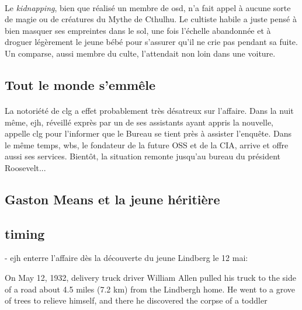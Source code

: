 \paragraph{} Le \emph{kidnapping}, bien que réalisé un membre de \gls{osd}, n'a fait appel à aucune sorte de magie ou de créatures
du Mythe de Cthulhu. Le cultiste habile a juste pensé à bien masquer ses empreintes dans le sol, une fois l'échelle abandonnée et 
à droguer légèrement le jeune bébé pour s'assurer qu'il ne crie pas pendant sa fuite. Un comparse, aussi membre du culte, l'attendait
non loin dans une voiture.
\subsection{Tout le monde s'emmêle}
\paragraph{} La notoriété de \gls{clg} a effet probablement très désatreux sur l'affaire. Dans la nuit même, \gls{ejh}, réveillé exprès
par un de ses assistants ayant appris la nouvelle, appelle \gls{clg} pour l'informer que le Bureau se tient près à assister l'enquête.
Dans le même temps, \gls{wbs}, le fondateur de la future OSS et de la CIA, arrive et offre aussi ses services. Bientôt, la situation
remonte jusqu'au bureau du président Roosevelt...
\subsection{Gaston Means et la jeune héritière}
 









\subsection{timing}

- \gls{ejh} enterre l'affaire dès la découverte du jeune Lindberg le 12 mai:

On May 12, 1932, delivery truck driver William Allen pulled his truck to the side of a road about 4.5 miles (7.2 km) from the Lindbergh home. He went to a grove of trees to relieve himself, and there he discovered the corpse of a toddler
